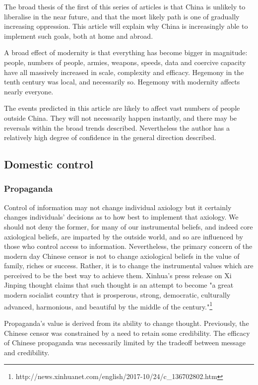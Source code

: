 The broad thesis of the first of this series of articles is that China
is unlikely to liberalise in the near future, and that the most likely
path is one of gradually increasing oppression. This article will
explain why China is increasingly able to implement such goals, both at
home and abroad.

A broad effect of modernity is that everything has become bigger in
magnitude: people, numbers of people, armies, weapons, speeds, data and
coercive capacity have all massively increased in scale, complexity and
efficacy. Hegemony in the tenth century was local, and necessarily so.
Hegemony with modernity affects nearly everyone.

The events predicted in this article are likely to affect vast numbers
of people outside China. They will not necessarily happen instantly, and
there may be reversals within the broad trends described. Nevertheless
the author has a relatively high degree of confidence in the general
direction described.

\subsection{Domestic control}\label{domestic-control}

\subsubsection{Propaganda}\label{propaganda}

Control of information may not change individual axiology but it
certainly changes individuals' decisions as to how best to implement
that axiology. We should not deny the former, for many of our
instrumental beliefs, and indeed core axiological beliefs, are imparted
by the outside world, and so are influenced by those who control access
to information. Nevertheless, the primary concern of the modern day
Chinese censor is not to change axiological beliefs in the value of
family, riches or success. Rather, it is to change the instrumental
values which are perceived to be the best way to achieve them. Xinhua's
press release on Xi Jinping thought claims that such thought is an
attempt to become "a great modern socialist country that is prosperous,
strong, democratic, culturally advanced, harmonious, and beautiful by
the middle of the century."\footnote{http://news.xinhuanet.com/english/2017-10/24/c\_136702802.htm}

Propaganda's value is derived from its ability to change thought.
Previously, the Chinese censor was constrained by a need to retain some
credibility. The efficacy of Chinese propaganda was necessarily limited
by the tradeoff between message and credibility.

